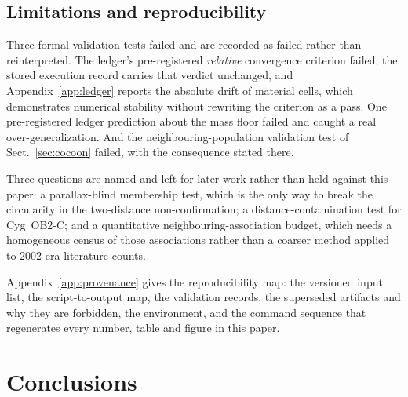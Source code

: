 \documentclass{aa}
\begin{document}
\subsection{Limitations and reproducibility}\label{sec:limitations}

Three formal validation tests failed and are recorded as failed rather than
reinterpreted.
The ledger's pre-registered \emph{relative} convergence criterion failed; the
stored execution record carries that verdict unchanged, and
Appendix~\ref{app:ledger} reports the absolute drift of material cells, which
demonstrates numerical stability without rewriting the criterion as a pass. One
pre-registered ledger prediction about the mass floor failed and caught a real
over-generalization. And the neighbouring-population validation test of
Sect.~\ref{sec:cocoon}
failed, with the consequence stated there.

Three questions are named and left for later work rather than held against this
paper: a parallax-blind membership test, which is the only way to break the
circularity in the two-distance non-confirmation; a distance-contamination test
for Cyg~OB2-C; and a quantitative neighbouring-association budget, which needs a
homogeneous census of those associations rather than a coarser method applied to
2002-era literature counts.

Appendix~\ref{app:provenance} gives the reproducibility map: the versioned input
list, the script-to-output map, the validation records, the superseded artifacts and
why they are forbidden, the environment, and the command sequence that
regenerates every number, table and figure in this paper.

\section{Conclusions}\label{sec:conclusions}
\end{document}
